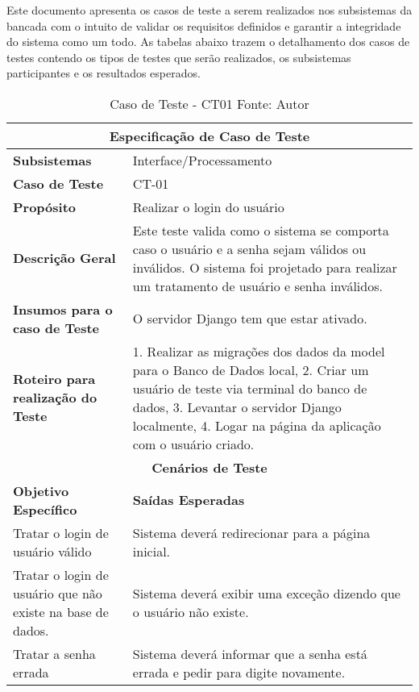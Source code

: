 Este documento apresenta os casos de teste a serem realizados nos subsistemas da bancada com o intuito de validar os requisitos
definidos e garantir a integridade do sistema como um todo. As tabelas abaixo trazem o detalhamento dos casos de testes contendo os tipos de testes que serão 
realizados, os subsistemas participantes e os resultados esperados.
\vfill
\begin{table}[]
    \begin{center}
        \begin{longtable}{|p{5cm}|p{12cm}|}
            \hline
            \multicolumn{2}{|c|}{\textbf{Especificação de Caso de Teste}} \\ \hline
                \textbf{Subsistemas}                               & Interface/Processamento \\ \hline
                \textbf{Caso de Teste}                             & CT-01 \\ \hline
                \textbf{Propósito}                                     & Realizar o login do usuário \\ \hline
                \textbf{Descrição Geral}                           & Este teste valida como o sistema se comporta caso o usuário e a senha sejam válidos ou inválidos. O sistema foi projetado para realizar um tratamento de usuário e senha inválidos. \\ \hline
                \textbf{Insumos para o caso de Teste}    & O servidor Django tem que estar ativado. \\ \hline
                \textbf{Roteiro para realização do Teste}&  1. Realizar as migrações dos dados da model para o Banco de Dados local, 2. Criar um usuário de teste via terminal do banco de dados, 3. Levantar o servidor Django localmente, 4. Logar na página da aplicação com o usuário criado. \\ \hline
            \multicolumn{2}{|c|}{\textbf{Cenários de Teste}} \\ \hline
                \textbf{Objetivo Específico}                      & \textbf{Saídas Esperadas} \\ \hline
		  Tratar o login de usuário válido                           & Sistema deverá redirecionar para a página inicial.                                                                                                                                                                                    \\ \hline
		  Tratar o login de usuário que não existe na base de dados. & Sistema deverá exibir uma exceção dizendo que o usuário não existe.                                                                                                                                                                   \\ \hline
		  Tratar a senha errada                                      & Sistema deverá informar que a senha está errada e pedir para digite novamente.   
        \end{longtable}
    \end{center}
    \caption[Caso de Teste - CT01]{Caso de Teste - CT01
    \protect Fonte: Autor}
    \label{CT-01}
\end{table}

